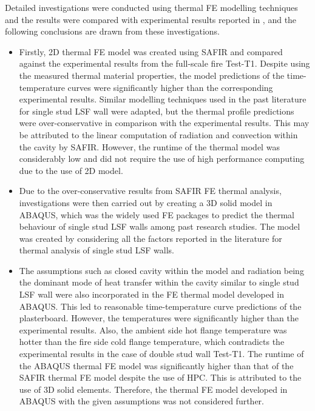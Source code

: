 Detailed investigations were conducted using thermal FE modelling techniques and the results were compared with experimental results reported in , and the following conclusions are drawn from these investigations. 
\begin{itemize}
	\item Firstly, 2D thermal FE model was created using SAFIR and compared against the experimental results from the full-scale fire Test-T1. Despite using the measured thermal material properties, the model predictions of the time-temperature curves were significantly higher than the corresponding experimental results. Similar modelling techniques used in the past literature for single stud LSF wall were adapted, but the thermal profile predictions were over-conservative in comparison with the experimental results. This may be attributed to the linear computation of radiation and convection within the cavity by SAFIR. However, the runtime of the thermal model was considerably low and did not require the use of high performance computing due to the use of 2D model.
	\item Due to the over-conservative results from SAFIR FE thermal analysis, investigations were then carried out by creating a 3D solid model in ABAQUS, which was the widely used FE packages to predict the thermal behaviour of single stud LSF walls among past research studies. The model was created by considering all the factors reported in the literature for thermal analysis of single stud LSF walls. 
	\item The assumptions such as closed cavity within the model and radiation being the dominant mode of heat transfer within the cavity similar to single stud LSF wall were also incorporated in the FE thermal model developed in ABAQUS. This led to reasonable time-temperature curve predictions of the plasterboard. However, the temperatures were significantly higher than the experimental results. Also, the ambient side hot flange temperature was hotter than the fire side cold flange temperature, which contradicts the experimental results in the case of double stud wall Test-T1. The runtime of the ABAQUS thermal FE model was significantly higher than that of the SAFIR thermal FE model despite the use of HPC. This is attributed to the use of 3D solid elements. Therefore, the thermal FE model developed in ABAQUS with the given assumptions was not considered further. 

\end{itemize}
